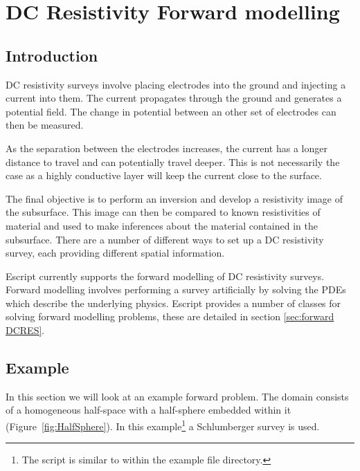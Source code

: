 %
%
%

\chapter{DC Resistivity Forward modelling}\label{Chp:cook:Dc Resistivity inversion}
\section{Introduction}
DC resistivity surveys involve placing electrodes into the ground and injecting a current
into them. The current propagates through the ground and generates a potential field.
The change in potential between an other set of electrodes can then be measured.

As the separation between the electrodes increases, the current has a longer 
distance to travel and can potentially travel deeper. This is not necessarily the case 
as a highly conductive layer will keep the current close to the surface.

The final objective is to perform an inversion and develop a resistivity image of the subsurface.
This image can then be compared to known resistivities of material and used 
to make inferences about the material contained in the subsurface.
There are a number of different ways to set up a DC resistivity survey, each providing
different spatial information\cite[pg 5]{LOKE2014}.

Escript currently supports the forward modelling of DC resistivity surveys. Forward modelling
involves performing a survey artificially by solving the PDEs which describe the underlying
physics. Escript provides a number of classes for solving forward modelling problems, these are
detailed in section \ref{sec:forward DCRES}.

\section{Example}
In this section we will look at an example forward problem. The domain consists of
a homogeneous half-space with a half-sphere embedded within it (Figure~\ref{fig:HalfSphere}). 
In this example\footnote{The script is similar to
 within the \escript example file directory.}
 a Schlumberger survey is used.


